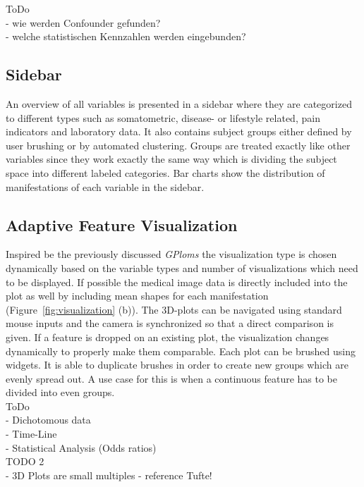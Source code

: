\documentclass[journal]{style/vgtc} 			          %
\begin{document}
ToDo\\
- wie werden Confounder gefunden?\\
- welche statistischen Kennzahlen werden eingebunden?\\

\subsection{Sidebar}
An overview of all variables is presented in a sidebar where they are categorized to different types such as somatometric, disease- or lifestyle related, pain indicators and laboratory data.
%
It also contains subject groups either defined by user brushing or by automated clustering.
%
Groups are treated exactly like other variables since they work exactly the same way which is dividing the subject space into different labeled categories.
Bar charts show the distribution of manifestations of each variable in the sidebar.

\subsection{Adaptive Feature Visualization} \label{sec:AdaptiveFeatureVisualization}
Inspired be the previously discussed \emph{GPloms} \cite{Francois2013} the visualization type is chosen dynamically based on the variable types and number of visualizations which need to be displayed.
If possible the medical image data is directly included into the plot as well by including mean shapes for each manifestation (Figure~\ref{fig:visualization} (b)).
%
The 3D-plots can be navigated using standard mouse inputs and the camera is synchronized so that a direct comparison is given.
%
If a feature is dropped on an existing plot, the visualization changes dynamically to properly make them comparable. 
%
Each plot can be brushed using widgets.
%
It is able to duplicate brushes in order to create new groups which are evenly spread out.
%
A use case for this is when a continuous feature has to be divided into even groups.
\\
ToDo\\
- Dichotomous data\\
- Time-Line\\
- Statistical Analysis (Odds ratios)\\

TODO 2\\
- 3D Plots are small multiples - reference Tufte!
\end{document}
